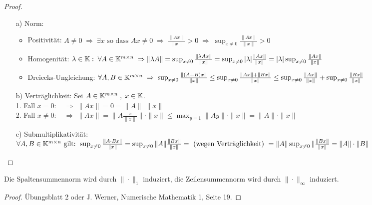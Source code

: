 \begin{proof}
\quad
\begin{enumerate}
  \item [a)] Norm:
    \begin{itemize}
      \item Positivität: $A \ne 0 \; \Rightarrow \; \exists x \text{ so dass }
    A x \ne 0 \; \Rightarrow \; \frac{\| A x \|}{\| x \|} > 0
    \; \Rightarrow \;  \sup_{ x\ne 0} \frac{\| A x \|}{\| x \|} > 0$
      \item Homogenität: $\lambda \in \mathbb K:\; \forall A \in \mathbb K^{m \times n} \;
      \Rightarrow \| \lambda A \| = \sup_{ x\ne 0} \frac{\| \lambda A x \|}{\| x \|} =
      \sup_{ x\ne 0} |\lambda|  \frac{\| A x \|}{\| x \|} =
      |\lambda| \sup_{ x\ne 0} \frac{\| A x \|}{\| x \|}$
      \item Dreiecks-Ungleichung: $\forall A, B  \in \mathbb K^{m \times n} \; \Rightarrow \;
      \sup_{ x\ne 0} \frac{\| (A + B) x \|}{\| x \|} \le
      \sup_{ x\ne 0} \frac{\| A x \| + \| B x \|}{\| x \|} \le
      \sup_{ x\ne 0} \frac{\| A x \|}{\| x \|} + \sup_{ x\ne 0} \frac{\| B x \|}{\| x \|}$
    \end{itemize}
  \item [b)] Verträglichkeit: Sei $A \in \mathbb K^{m \times n} \; , \; x \in \mathbb K$.\\
    1. Fall $x = 0  : \quad \Rightarrow \; \| A x \| = 0 = \|A \| \; \|x\| $\\
    2. Fall $x \ne 0  : \quad \Rightarrow \; \| A x \| =
    \| A \frac{x}{\|x\|}\| \cdot \| x \| \le
    \max_{y = 1} \| A y \| \cdot \| x \| = \| A \| \cdot \| x \|$
  \item [c)] Submultiplikativität: $\forall A, B  \in \mathbb K^{m \times n} \text{ gilt: }
  \sup_{ x\ne 0} \frac{\| A \cdot B x \|}{\| x \|} =
  \sup_{ x\ne 0} \| A \| \frac{\| B x \|}{\| x \|} = \\
  \text{ (wegen Verträglichkeit) } = \| A \|  \sup_{ x\ne 0}  \| \frac{\| B x \|}{\| x \|}
  = \|A\| \cdot \|B\|$
\end{enumerate}
\end{proof}

\begin{Satz}
  Die Spaltensummennorm wird durch $\| \cdot \|_1$ induziert, die Zeilensummennorm
  wird durch $\| \cdot \|_\infty$ induziert.
\end{Satz}
\begin{proof}
  Übungsblatt 2 oder J. Werner, Numerische Mathematik 1, Seite 19.
\end{proof}

